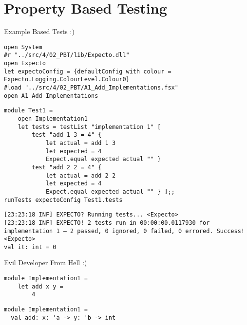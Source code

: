 \documentclass[t]{beamer}
\begin{document}
\section{Property Based Testing }
\label{sec:orga735bb0}
\begin{frame}[label={sec:orgd7da06d},fragile]{Example Based Tests :)}
 \begin{verbatim}
open System
#r "../src/4/02_PBT/lib/Expecto.dll"
open Expecto
let expectoConfig = {defaultConfig with colour = Expecto.Logging.ColourLevel.Colour0}
#load "../src/4/02_PBT/A1_Add_Implementations.fsx"
open A1_Add_Implementations
\end{verbatim}

\begin{verbatim}
module Test1 =
    open Implementation1
    let tests = testList "implementation 1" [
        test "add 1 3 = 4" {
            let actual = add 1 3
            let expected = 4
            Expect.equal expected actual "" }
        test "add 2 2 = 4" {
            let actual = add 2 2
            let expected = 4
            Expect.equal expected actual "" } ];;
runTests expectoConfig Test1.tests
\end{verbatim}

\begin{verbatim}
[23:23:18 INF] EXPECTO? Running tests... <Expecto>
[23:23:18 INF] EXPECTO! 2 tests run in 00:00:00.0117930 for implementation 1 – 2 passed, 0 ignored, 0 failed, 0 errored. Success! <Expecto>
val it: int = 0
\end{verbatim}
\end{frame}

\begin{frame}[label={sec:org73301b5},fragile]{Evil Developer From Hell :(}
 \begin{verbatim}
module Implementation1 =
    let add x y =
        4
\end{verbatim}

\begin{verbatim}
module Implementation1 =
  val add: x: 'a -> y: 'b -> int
\end{verbatim}
\end{frame}
\end{document}

